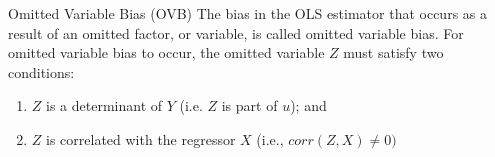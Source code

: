 \documentclass[notes,10pt, aspectratio=169]{beamer}
\begin{document}
\begin{frame}{Omitted Variable Bias (OVB)}
The bias in the OLS estimator that occurs as a result of an omitted factor, or variable, is called omitted variable bias. For omitted variable bias to occur, the omitted variable $Z$ must satisfy two conditions:
\begin{enumerate}
    \item $Z$ is a determinant of $Y$ (i.e. $Z$ is part of $u$); and
    \item $Z$ is correlated with the regressor $X$ (i.e., $corr(Z,X)\neq 0)$
\end{enumerate}

\begin{center}
\begin{figure}
\end{figure}
\end{center}
\end{frame}
\end{document}
